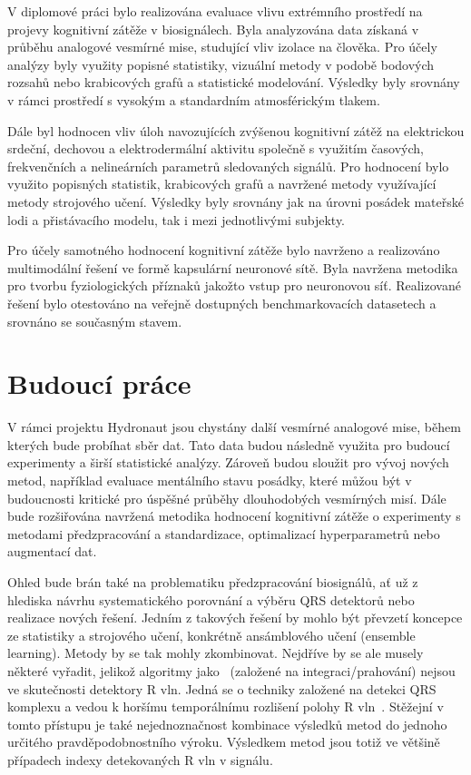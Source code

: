 V diplomové práci bylo realizována evaluace vlivu extrémního prostředí na
projevy kognitivní zátěže v biosignálech. Byla analyzována data získaná v
průběhu analogové vesmírné mise, studující vliv izolace na člověka. Pro účely
analýzy byly využity popisné statistiky, vizuální metody v podobě bodových
rozsahů nebo krabicových grafů a statistické modelování. Výsledky byly srovnány
v rámci prostředí s vysokým a standardním atmosférickým tlakem. 

Dále byl hodnocen vliv úloh navozujících zvýšenou kognitivní zátěž na
elektrickou srdeční, dechovou a elektrodermální aktivitu společně s využitím
časových, frekvenčních a nelineárních parametrů sledovaných signálů. Pro
hodnocení bylo využito popisných statistik, krabicových grafů a navržené metody
využívající metody strojového učení. Výsledky byly srovnány jak na úrovni
posádek mateřské lodi a přistávacího modelu, tak i mezi jednotlivými subjekty.

Pro účely samotného hodnocení kognitivní zátěže bylo navrženo a realizováno
multimodální řešení ve formě kapsulární neuronové sítě. Byla navržena metodika
pro tvorbu fyziologických příznaků jakožto vstup pro neuronovou síť. Realizované
řešení bylo otestováno na veřejně dostupných benchmarkovacích datasetech a
srovnáno se současným stavem. 

\section{Budoucí práce}
V rámci projektu Hydronaut jsou chystány další vesmírné analogové mise, během
kterých bude probíhat sběr dat. Tato data budou následně využita pro budoucí
experimenty a širší statistické analýzy. Zároveň budou sloužit pro vývoj nových
metod, například evaluace mentálního stavu posádky, které můžou být v
budoucnosti kritické pro úspěšné průběhy dlouhodobých vesmírných misí. Dále bude
rozšiřována navržená metodika hodnocení kognitivní zátěže o experimenty s
metodami předzpracování a standardizace, optimalizací hyperparametrů nebo
augmentací dat. 

Ohled bude brán také na problematiku předzpracování biosignálů, ať už z hlediska
návrhu systematického porovnání a výběru QRS detektorů nebo realizace nových
řešení. Jedním z takových řešení by mohlo být převzetí koncepce ze statistiky a
strojového učení, konkrétně ansámblového učení (ensemble learning). Metody by se
tak mohly zkombinovat. Nejdříve by se ale musely některé vyřadit, jelikož
algoritmy jako~\cite{Tompkins1985,Christov2004} (založené na
integraci/prahování) nejsou ve skutečnosti detektory R vln. Jedná se o techniky
založené na detekci QRS komplexu a vedou k horšímu temporálnímu rozlišení polohy
R vln~\cite{Porr2019}. Stěžejní v tomto přístupu je také nejednoznačnost
kombinace výsledků metod do jednoho určitého pravděpodobnostního výroku.
Výsledkem metod jsou totiž ve většině případech indexy detekovaných R vln v
signálu. 

